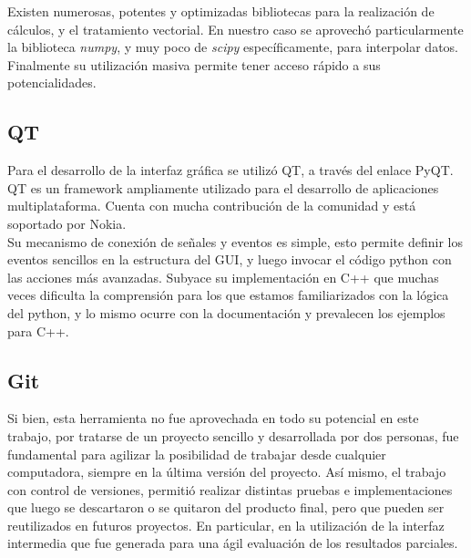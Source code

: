Existen numerosas, potentes y optimizadas bibliotecas para la realizaci\'on de c\'alculos, y el tratamiento vectorial. En nuestro caso se aprovech\'o particularmente la biblioteca {\it{numpy}}, y muy poco de {\it{scipy}} espec\'ificamente, para interpolar datos.
Finalmente su utilizaci\'on masiva permite tener acceso r\'apido a sus potencialidades.\\

\subsection*{QT}
Para el desarrollo de la interfaz gr\'afica se utiliz\'o QT, a trav\'es del enlace PyQT.\\
QT es un framework ampliamente utilizado para el desarrollo de aplicaciones multiplataforma. Cuenta con mucha contribuci\'on de la comunidad y est\'a soportado por Nokia.\\

Su mecanismo de conexión de señales y eventos es simple, esto permite definir los eventos sencillos en la estructura del GUI, y luego invocar el c\'odigo python con las acciones m\'as avanzadas. Subyace su implementaci\'on en C++ que muchas veces dificulta la comprensi\'on para los que estamos familiarizados con la l\'ogica del python, y lo mismo ocurre con la documentaci\'on y prevalecen los ejemplos para C++.\\

\subsection*{Git}
Si bien, esta herramienta no fue aprovechada en todo su potencial en este trabajo, por tratarse de un proyecto sencillo y desarrollada por dos personas, fue fundamental para agilizar la posibilidad de trabajar desde cualquier computadora, siempre en la \'ultima versi\'on del proyecto.
As\'i mismo, el trabajo con control de versiones, permiti\'o realizar distintas pruebas e implementaciones que luego se descartaron o se quitaron del producto final, pero que pueden ser reutilizados en futuros proyectos. En particular, en la utilizaci\'on de la interfaz intermedia que fue generada para una \'agil evaluaci\'on de los resultados parciales.\\






